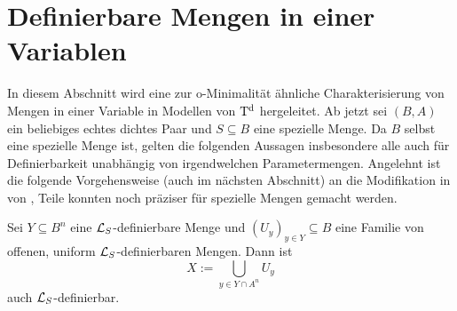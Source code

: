 \section{Definierbare Mengen in einer Variablen}
In diesem Abschnitt wird eine zur o-Minimalität ähnliche Charakterisierung von Mengen in einer Variable in Modellen von $\operatorname{T^d}$ hergeleitet. Ab jetzt sei $(B,A)$ ein beliebiges echtes dichtes Paar und $S\subseteq B$ eine spezielle Menge. Da $B$ selbst eine spezielle Menge ist, gelten die folgenden Aussagen insbesondere alle auch für Definierbarkeit unabhängig von irgendwelchen Parametermengen. Angelehnt ist die folgende Vorgehensweise (auch im nächsten Abschnitt) an die Modifikation in \cite{Piz} von \cite{VanDenDries}, Teile konnten noch präziser für spezielle Mengen gemacht werden.

\begin{lemma}
	Sei $Y\subseteq B^n$ eine $\mathcal{L}_S$-definierbare Menge und $(U_y)_{y\in Y}\subseteq B$ eine Familie von offenen, uniform $\mathcal{L}_S$-definierbaren Mengen. Dann ist $$X:=\bigcup\limits_{y\in Y\cap A^n}U_y$$ auch $\mathcal{L}_S$-definierbar.
\end{lemma}
